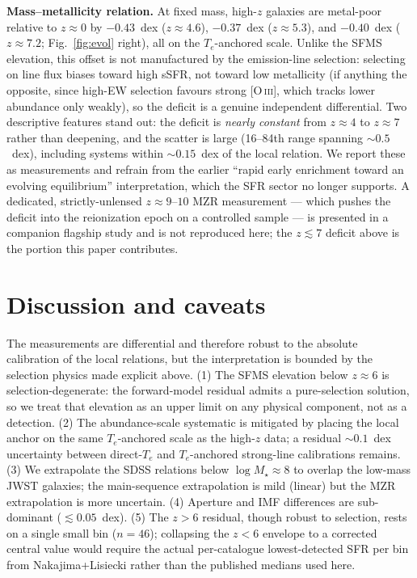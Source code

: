 \documentclass[twocolumn]{aastex631}
\begin{document}
\textbf{Mass--metallicity relation.} At fixed mass, high-$z$ galaxies are metal-poor relative to $z\approx0$ by $-0.43$~dex ($z\!\approx\!4.6$), $-0.37$~dex ($z\!\approx\!5.3$), and $-0.40$~dex ($z\!\approx\!7.2$; Fig.~\ref{fig:evol} right), all on the $T_e$-anchored scale. Unlike the SFMS elevation, this offset is not manufactured by the emission-line selection: selecting on line flux biases toward high sSFR, not toward low metallicity (if anything the opposite, since high-EW selection favours strong [O\,\textsc{iii}], which tracks lower abundance only weakly), so the deficit is a genuine independent differential. Two descriptive features stand out: the deficit is \emph{nearly constant} from $z\approx4$ to $z\approx7$ rather than deepening, and the scatter is large (16--84th range spanning $\sim0.5$~dex), including systems within $\sim0.15$~dex of the local relation. We report these as measurements and refrain from the earlier ``rapid early enrichment toward an evolving equilibrium'' interpretation, which the SFR sector no longer supports. A dedicated, strictly-unlensed $z\approx9$--$10$ MZR measurement --- which pushes the deficit into the reionization epoch on a controlled sample --- is presented in a companion flagship study and is not reproduced here; the $z\lesssim7$ deficit above is the portion this paper contributes.

\section{Discussion and caveats}
The measurements are differential and therefore robust to the absolute calibration of the local relations, but the interpretation is bounded by the selection physics made explicit above. (1) The SFMS elevation below $z\approx6$ is selection-degenerate: the forward-model residual admits a pure-selection solution, so we treat that elevation as an upper limit on any physical component, not as a detection. (2) The abundance-scale systematic is mitigated by placing the local anchor on the same $T_e$-anchored scale as the high-$z$ data; a residual $\sim0.1$~dex uncertainty between direct-$T_e$ and $T_e$-anchored strong-line calibrations remains. (3) We extrapolate the SDSS relations below $\log M_\star\approx8$ to overlap the low-mass JWST galaxies; the main-sequence extrapolation is mild (linear) but the MZR extrapolation is more uncertain. (4) Aperture and IMF differences are sub-dominant ($\lesssim0.05$~dex). (5) The $z>6$ residual, though robust to selection, rests on a single small bin ($n=46$); collapsing the $z<6$ envelope to a corrected central value would require the actual per-catalogue lowest-detected SFR per bin from Nakajima+Lisiecki rather than the published medians used here.
\end{document}
